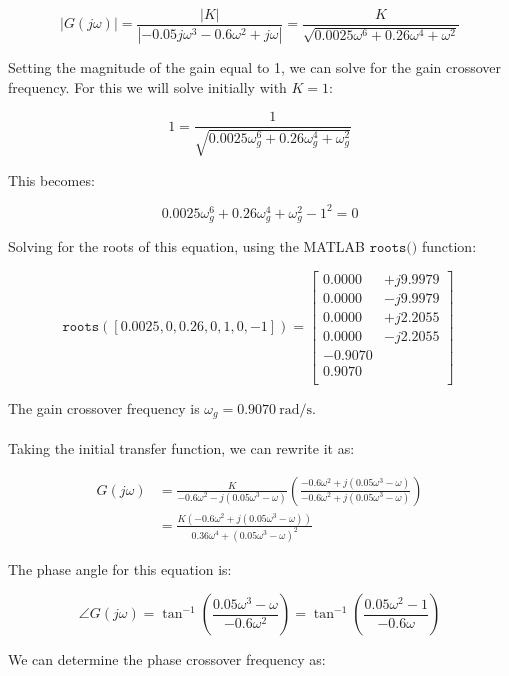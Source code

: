 \documentclass[12pt, letterpaper]{../assignment}
\begin{document}
$$ |G(j\omega)| = \frac{|K|}{|- 0.05 j \omega ^3 - 0.6 \omega ^2 + j \omega |}
                = \frac{K}{\sqrt{0.0025 \omega^6 + 0.26 \omega^4 + \omega^2 }}$$

Setting the magnitude of the gain equal to 1, we can solve for the gain crossover frequency.
For this we will solve initially with $K=1$:

$$ 1 = \frac{1}{\sqrt{0.0025 \omega_g^6 + 0.26 \omega_g^4 + \omega_g^2 }}$$

This becomes:

$$ 0.0025 \omega_g^6 + 0.26 \omega_g^4 + \omega_g^2 - 1^2  = 0 $$

Solving for the roots of this equation, using the MATLAB $\texttt{roots()}$ function:


$$ \texttt{roots}([0.0025,0,0.26,0,1,0,-1]) = \left[\begin{array}{rr} 
    0.0000 &+ j9.9979\\
    0.0000 &- j9.9979\\
    0.0000 &+ j2.2055\\
    0.0000 &- j2.2055\\
   -0.9070 & \\
   \mathbf{ 0.9070} & \\
    \end{array} \right]\ $$

The gain crossover frequency is $ \omega_g = 0.9070 \ \text{rad/s} $.
\\\\
Taking the initial transfer function, we can rewrite it as:

\begin{equation*}
\begin{aligned}
G(j\omega) &= \frac{K}{- 0.6 \omega ^2 - j(0.05\omega ^3 - \omega) }
        \left(\frac{- 0.6 \omega ^2 + j(0.05\omega ^3 - \omega)}
                   {- 0.6 \omega ^2 + j(0.05\omega ^3 - \omega)}\right)\\
           & = \frac{K(- 0.6 \omega ^2 + j(0.05\omega ^3 - \omega))}
                    { 0.36 \omega ^4 + (0.05\omega ^3 - \omega)^2 }
\end{aligned}
\end{equation*}

The phase angle for this equation is:

$$ \angle G(j\omega) = \tan^{-1} \left( \frac{0.05\omega ^3 - \omega}{- 0.6 \omega ^2} \right)
                     = \tan^{-1} \left( \frac{0.05\omega ^2 - 1}{- 0.6 \omega} \right) $$

We can determine the phase crossover frequency as:
\end{document}

